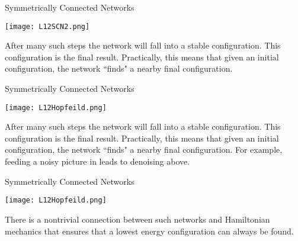\documentclass[10pt, table, dvipsnames,xcdraw, handout]{beamer}
\begin{document}
\begin{frame}[fragile]{Symmetrically Connected Networks}
  \begin{minipage}[t][0.5\textheight][t]{\textwidth}
	\centering \texttt{[image: L12SCN2.png]} 
  \end{minipage}
  \vfill
\begin{minipage}[t][0.5\textheight][t]{\textwidth}
After many such steps the network will fall into a stable configuration. This configuration is the final result. \pause Practically, this means that given an initial configuration, the network ``finds" a nearby final configuration. 

\end{minipage}
\end{frame}

\begin{frame}[fragile]{Symmetrically Connected Networks}
  \begin{minipage}[t][0.5\textheight][t]{\textwidth}
	\centering \texttt{[image: L12Hopfeild.png]} 
  \end{minipage}
  \vfill
\begin{minipage}[t][0.5\textheight][t]{\textwidth}
After many such steps the network will fall into a stable configuration. This configuration is the final result. \pause Practically, this means that given an initial configuration, the network ``finds" a nearby final configuration. For example, feeding a noisy picture in leads to denoising above. 
\end{minipage}
\end{frame}



\begin{frame}[fragile]{Symmetrically Connected Networks}
  \begin{minipage}[t][0.5\textheight][t]{\textwidth}
	\centering \texttt{[image: L12Hopfeild.png]} 
  \end{minipage}
  \vfill
\begin{minipage}[t][0.5\textheight][t]{\textwidth}
There is a nontrivial connection between such networks and Hamiltonian mechanics that ensures that a lowest energy configuration can always be found. 
\end{minipage}
\end{frame}
\end{document}
